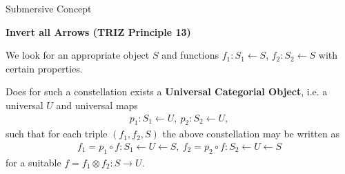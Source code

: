 \documentclass{beamer}
\newcommand{\ueberschrift}[1]{\begin{center}\bf #1\end{center}}
\begin{document}
\begin{frame}{Submersive Concept}

\ueberschrift{Invert all Arrows (TRIZ Principle 13)}
\small

We look for an appropriate object $S$ and functions $f_1: S_1 \leftarrow S$,
$f_2: S_2 \leftarrow S$ with certain properties.

Does for such a constellation exists a \textbf{Universal Categorial Object},
i.e. a universal $U$ and universal maps
\begin{gather*}
  p_1: S_1 \leftarrow U,\ p_2: S_2 \leftarrow U,
\end{gather*}
such that for each triple $(f_1, f_2, S)$ the above constellation may be
written as
\begin{gather*}
  f_1 = p_1 \circ f: S_1 \leftarrow U \leftarrow S,\ f_2 = p_2 \circ f : S_2
  \leftarrow U \leftarrow S
\end{gather*}
for a suitable $f = f_1 \otimes f_2: S \rightarrow U$. 

\end{frame}
\end{document}
